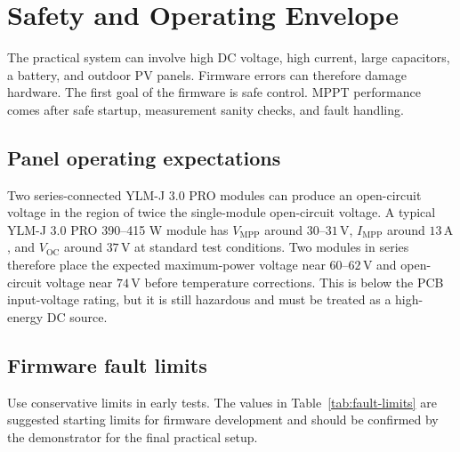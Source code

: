 \documentclass[11pt,a4paper]{article}
\let\originalsection\section
\renewcommand{\section}{\clearpage\originalsection}
\begin{document}
\section{Safety and Operating Envelope}

The practical system can involve high DC voltage, high current, large capacitors, a battery, and outdoor PV panels. Firmware errors can therefore damage hardware. The first goal of the firmware is safe control. MPPT performance comes after safe startup, measurement sanity checks, and fault handling.

\subsection{Panel operating expectations}

Two series-connected YLM-J 3.0 PRO modules can produce an open-circuit voltage in the region of twice the single-module open-circuit voltage. A typical YLM-J 3.0 PRO 390--415 W module has $V_{\mathrm{MPP}}$ around $30$--$31\,\mathrm{V}$, $I_{\mathrm{MPP}}$ around $13\,\mathrm{A}$, and $V_{\mathrm{OC}}$ around $37\,\mathrm{V}$ at standard test conditions. Two modules in series therefore place the expected maximum-power voltage near $60$--$62\,\mathrm{V}$ and open-circuit voltage near $74\,\mathrm{V}$ before temperature corrections. This is below the PCB input-voltage rating, but it is still hazardous and must be treated as a high-energy DC source.

\subsection{Firmware fault limits}

Use conservative limits in early tests. The values in Table~\ref{tab:fault-limits} are suggested starting limits for firmware development and should be confirmed by the demonstrator for the final practical setup.
\end{document}
